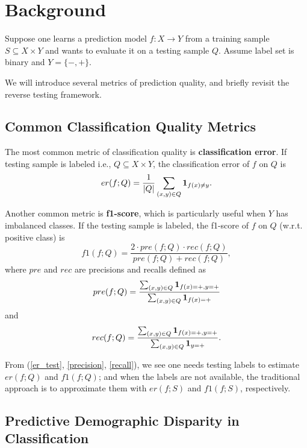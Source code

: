 \section{Background}

Suppose one learns a prediction model $f: X \rightarrow 
Y$ from a training sample $S \subseteq X \times Y$ and wants 
to evaluate it on a testing sample $Q$. 
Assume label set is binary and $Y = \{-, +\}$. 

We will introduce several metrics of prediction quality, 
and briefly revisit the reverse testing framework. 

\subsection{Common Classification Quality Metrics}

The most common metric of classification quality is 
\textbf{classification error}. If testing sample is labeled 
i.e., $Q \subseteq X \times Y$, the classification error of 
$f$ on $Q$ is 
\begin{equation}
\label{er_test}
er(f; Q) = \frac{1}{|Q|} \sum_{(x, y) \in Q} 
{\bf 1}_{f(x) \neq y}.
\end{equation}

Another common metric is \textbf{f1-score}, 
which is particularly useful when $Y$ has imbalanced classes. 
If the testing sample is labeled, the f1-score of $f$ on $Q$ 
(w.r.t. positive class) is 
\begin{equation}
\label{f1_test}
f1(f; Q) = \frac{2 \cdot pre(f; Q) \cdot rec(f; Q)}{
pre(f; Q) + rec(f; Q)},    
\end{equation}
where $pre$ and $rec$ are precisions and recalls 
defined as 
\begin{equation}
\label{precision}
pre(f; Q) = \frac{\sum_{(x,y) \in Q} {\bf 1}_{f(x) = +, y = +}
}{\sum_{(x,y) \in Q} {\bf 1}_{f(x)=+}}
\end{equation}
and 
\begin{equation}
\label{recall}
rec(f; Q) = \frac{\sum_{(x,y) \in Q} {\bf 1}_{f(x) = +, y = +}
}{\sum_{(x,y) \in Q} {\bf 1}_{y=+}}. 
\end{equation}

From (\ref{er_test}, \ref{precision}, \ref{recall}), we see 
one needs testing labels to estimate $er(f; Q)$ and $f1(f; Q)$; 
and when the labels are not available, the traditional approach 
is to approximate them with $er(f; S)$ and $f1(f; S)$, respectively. 

\subsection{Predictive Demographic Disparity in Classification}


